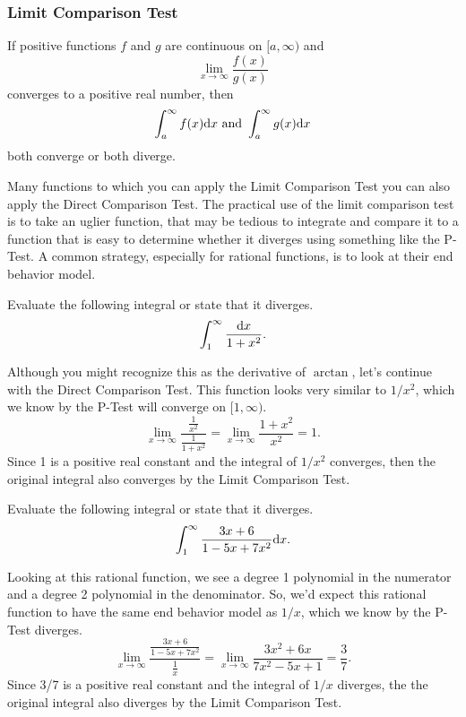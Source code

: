 \subsubsection{Limit Comparison Test}
\begin{lemma}
	If positive functions $f$ and $g$ are continuous on $[a,\infty)$ and
	\begin{equation*}
		\lim_{x\to\infty}{\frac{f(x)}{g(x)}}
	\end{equation*}
	converges to a positive real number, then
	\begin{equation*}
		\int_{a}^{\infty}{f(x)\mathrm{d} x} \text { and } \int_{a}^{\infty}{g(x)\mathrm{d} x}
	\end{equation*}
	both converge or both diverge.
\end{lemma}

\noindent
Many functions to which you can apply the Limit Comparison Test you can also apply the Direct Comparison Test.
The practical use of the limit comparison test is to take an uglier function, that may be tedious to integrate and compare it to a function that is easy to determine whether it diverges using something like the P-Test.
A common strategy, especially for rational functions, is to look at their end behavior model.

\begin{example}
	Evaluate the following integral or state that it diverges.
	\begin{equation*}
		\int_{1}^{\infty}{\frac{\mathrm{d} x}{1+x^2}}.
	\end{equation*}
\end{example}
Although you might recognize this as the derivative of $\arctan$, let's continue with the Direct Comparison Test.
This function looks very similar to $1/x^2$, which we know by the P-Test will converge on $[1,\infty)$.
\begin{equation*}
	\lim_{x\to\infty}{\frac{\frac{1}{x^2}}{\frac{1}{1+x^2}}} = \lim_{x\to\infty}{\frac{1+x^2}{x^2}} = 1.
\end{equation*}
Since 1 is a positive real constant and the integral of $1/x^2$ converges, then the original integral also converges by the Limit Comparison Test.

\begin{example}
	Evaluate the following integral or state that it diverges.
	\begin{equation*}
		\int_{1}^{\infty}{\frac{3x+6}{1-5x+7x^2}\mathrm{d} x}.
	\end{equation*}
\end{example}
Looking at this rational function, we see a degree 1 polynomial in the numerator and a degree 2 polynomial in the denominator.
So, we'd expect this rational function to have the same end behavior model as $1/x$, which we know by the P-Test diverges.
\begin{equation*}
	\lim_{x\to\infty}{\frac{\frac{3x+6}{1-5x+7x^2}}{\frac{1}{x}}} = \lim_{x\to\infty}{\frac{3x^2+6x}{7x^2-5x+1}} = \frac{3}{7}.
\end{equation*}
Since 3/7 is a positive real constant and the integral of $1/x$ diverges, the the original integral also diverges by the Limit Comparison Test.